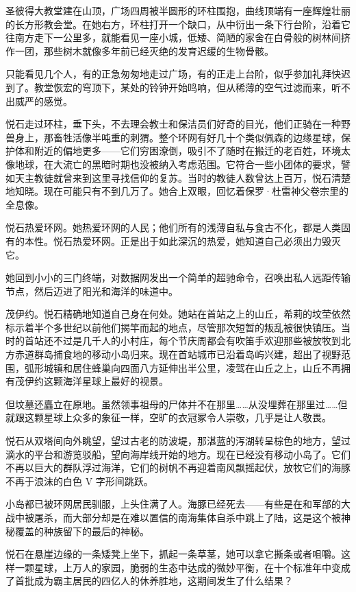 \documentclass[AutoFakeBold=true]{book}
\begin{document}
圣彼得大教堂建在山顶，广场四周被半圆形的环柱围抱，曲线顶端有一座辉煌壮丽的长方形教会堂。在她右方，环柱打开一个缺口，从中衍出一条下行台阶，沿着它往南方走下一公里多，就能看见一座小城，低矮、简陋的家舍在白骨般的树林间挤作一团，那些树木就像多年前已经灭绝的发育迟缓的生物骨骸。

只能看见几个人，有的正急匆匆地走过广场，有的正走上台阶，似乎参加礼拜快迟到了。教堂恢宏的穹顶下，某处的铃钟开始鸣响，但从稀薄的空气过滤而来，听不出威严的感觉。

悦石走过环柱，垂下头，不去理会教士和保洁员们好奇的目光，他们正骑在一种野兽身上，那畜牲活像半吨重的刺猬。整个环网有好几十个类似佩森的边缘星球，保护体和附近的偏地更多——它们穷困潦倒，吸引不了随时在搬迁的老百姓，环境太像地球，在大流亡的黑暗时期也没被纳入考虑范围。它符合一些小团体的要求，譬如天主教徒就曾来到这里寻找信仰的复苏。当时的教徒人数曾达上百万，悦石清楚地知晓。现在可能只有不到几万了。她合上双眼，回忆着保罗·杜雷神父卷宗里的全息像。

悦石热爱环网。她热爱环网的人民；他们所有的浅薄自私与食古不化，都是人类固有的本性。悦石热爱环网。正是出于如此深沉的热爱，她知道自己必须出力毁灭它。

她回到小小的三门终端，对数据网发出一个简单的超驰命令，召唤出私人远距传输节点，然后迈进了阳光和海洋的味道中。

茂伊约。悦石精确地知道自己身在何处。她站在首站之上的山丘，希莉的坟茔依然标示着半个多世纪以前他们揭竿而起的地点，尽管那次短暂的叛乱被很快镇压。当时的首站还不过是几千人的小村庄，每个节庆周都会有吹笛手欢迎那些被放牧到北方赤道群岛捕食地的移动小岛归来。现在首站城市已沿着岛屿兴建，超出了视野范围，弧形城镇和居住蜂巢向四面八方延伸出半公里，凌驾在山丘之上，山丘不再拥有茂伊约这颗海洋星球上最好的视景。

但坟墓还矗立在原地。虽然领事祖母的尸体并不在那里……从没埋葬在那里过……但就跟这颗星球上众多的象征一样，空旷的衣冠冢令人崇敬，几乎是让人敬畏。

悦石从双塔间向外眺望，望过古老的防波堤，那湛蓝的泻湖转呈棕色的地方，望过滴水的平台和游览驳船，望向海岸线开始的地方。现在已经没有移动小岛了。它们不再以巨大的群队浮过海洋，它们的树帆不再迎着南风飘摇起伏，放牧它们的海豚不再于浪沫的白色 V 字形间跳跃。

小岛都已被环网居民驯服，上头住满了人。海豚已经死去——有些是在和军部的大战中被屠杀，而大部分却是在难以置信的南海集体自杀中跳上了陆，这是这个被神秘覆盖的种族留下的最后的神秘。

悦石在悬崖边缘的一条矮凳上坐下，抓起一条草茎，她可以拿它撕条或者咀嚼。这样一颗星球，上万人的家园，脆弱的生态中达成的微妙平衡，在十个标准年中变成了首批成为霸主居民的四亿人的休养胜地，这期间发生了什么结果？
\end{document}
